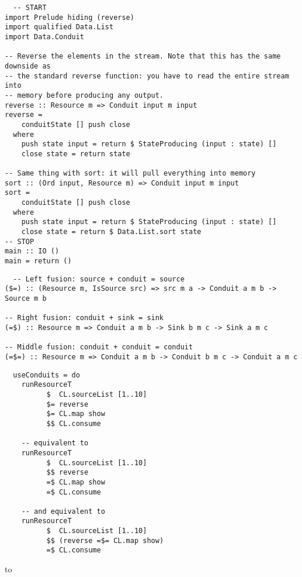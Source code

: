 \begin{lstlisting}
  -- START
import Prelude hiding (reverse)
import qualified Data.List
import Data.Conduit

-- Reverse the elements in the stream. Note that this has the same downside as
-- the standard reverse function: you have to read the entire stream into
-- memory before producing any output.
reverse :: Resource m => Conduit input m input
reverse =
    conduitState [] push close
  where
    push state input = return $ StateProducing (input : state) []
    close state = return state

-- Same thing with sort: it will pull everything into memory
sort :: (Ord input, Resource m) => Conduit input m input
sort =
    conduitState [] push close
  where
    push state input = return $ StateProducing (input : state) []
    close state = return $ Data.List.sort state
-- STOP
main :: IO ()
main = return ()
\end{lstlisting}
% 
\begin{lstlisting}
  -- Left fusion: source + conduit = source
($=) :: (Resource m, IsSource src) => src m a -> Conduit a m b -> Source m b

-- Right fusion: conduit + sink = sink
(=$) :: Resource m => Conduit a m b -> Sink b m c -> Sink a m c

-- Middle fusion: conduit + conduit = conduit
(=$=) :: Resource m => Conduit a m b -> Conduit b m c -> Conduit a m c
\end{lstlisting}
\begin{lstlisting}
  useConduits = do
    runResourceT
          $  CL.sourceList [1..10]
          $= reverse
          $= CL.map show
          $$ CL.consume

    -- equivalent to
    runResourceT
          $  CL.sourceList [1..10]
          $$ reverse
          =$ CL.map show
          =$ CL.consume

    -- and equivalent to
    runResourceT
          $  CL.sourceList [1..10]
          $$ (reverse =$= CL.map show)
          =$ CL.consume
\end{lstlisting}
to
